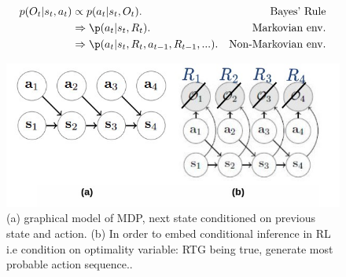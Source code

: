 \documentclass[conference]{IEEEtran}
\begin{document}
\begin{subequations}\label{eq:5}
\begin{align}
  p(O_t|s_t,a_t)& \propto p(a_t|s_t,O_t).\label{eq:5a} &\text{Bayes' Rule} \\
                & \Rightarrow \p(a_t|s_t,R_t).\label{eq:5b} &\text{Markovian env.} \\
 & \Rightarrow \p(a_t|s_t,R_t,a_{t-1},R_{t-1},...).\label{eq:5c} &\text{Non-Markovian env.}
\end{align}
\end{subequations}
\begin{figure}[htbp]
\centerline{\includegraphics[scale=0.35]{Images/graphical_model.jpg}}
\caption{(a) graphical model of MDP, next state conditioned on previous state and action. (b) In order to embed conditional inference in RL i.e condition on optimality variable: RTG being true, generate most probable action sequence.\cite{b12}.}
\label{fig}
\end{figure}
\end{document}
